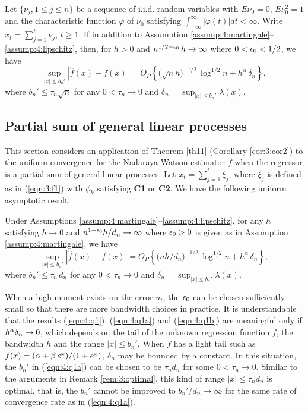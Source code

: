 \begin{cor} 
Let  $\{\nu_{j}, 1 \le j\le n \}$ be a sequence of i.i.d.
random variables with $E\nu_{0}=0$, $E\nu _{0}^{2}=1$ and the
characteristic function $\varphi $ of $\nu_{0}$ satisfying
$\int_{-\infty }^{\infty }|\varphi (t)|dt<\infty $. Write $x_t=\sum_{j=1}^t\nu_j$, $t\ge 1$. If in addition to Assumption \ref{assump:4:martingale}--\ref{assump:4:lipschitz}, then,  for  $h> 0$  and $n^{1/2-\epsilon_0}\, h\to \infty$ where $0<\epsilon_0<1/2$, we have
\begin{equation}
\sup_{|x|\le b_n'}|\widehat{f}(x)-f(x)|=
O_{P}\left\{\big(\sqrt{n}h\big)^{-1/2}\,\log^{1/2}n
+h^{\alpha}\, \delta_n\right\},
\label{eqn:4:q1a}\end{equation}
where $b_n'\le \tau_n\sqrt n$ for any $0<\tau_n\to 0$ and $\delta_n=\sup_{|x|\le b_n'}\lambda(x)$.
\end{cor}

\subsection{Partial sum of general linear processes}

This section considers an application of Theorem \ref{th11} (Corollary \ref{cor:3:cor2}) to the uniform convergence for the Nadaraya-Watson estimator $\widehat{f}$ when the regressor is a partial sum of general linear processes. Let $x_t=\sum_{j=1}^t\xi_j$, where $\xi_j$ is defined as in (\ref {eqn:3:f1}) with $\phi_k$ satisfying {\bf C1} or {\bf C2}. We have the following uniform asymptotic result.

\begin{thm}  Under Assumptions \ref{assump:4:martingale}--\ref{assump:4:lipschitz},
for any $h$ satisfying $h\to 0$ and $n^{1-\epsilon_0}h/d_n\to \infty$ where $\epsilon_0>0$ is given as in Assumption \ref{assump:4:martingale}, we have
\begin{equation} 
\sup_{|x|\le b_n'}|\widehat{f}(x)-f(x)|=
O_{P}\left\{\big(nh/d_n\big)^{-1/2}\,\log^{1/2}n
+h^{\alpha}\, \delta_n\right\},
\label{eqn:4:q1b}\end{equation}
where $b_n'\le \tau_n\,d_n $ for any  $0<\tau_n \to 0$ and $\delta_n=\sup_{|x|\le b_n'}\lambda(x)$.
\end{thm}


\begin{rem} When a high moment exists on the error $u_t$,
the $\epsilon_0$ can be chosen sufficiently small so that there are more bandwidth choices  in practice. It is understandable that the results (\ref {eqn:4:q1}), (\ref {eqn:4:q1a}) and (\ref {eqn:4:q1b}) are meaningful only if $h^{\alpha}\delta_n\to 0$, which depends on the tail of the unknown regression function $f$, the bandwidth $h$ and the range $|x|\le b_n'$.
When $f$ has a light tail such as $f(x)=(\alpha+\beta\, e^{x})/(1+e^x)$, $\delta_n$ may be bounded by a constant. In this situation, the $b_n'$ in (\ref {eqn:4:q1a}) can be chosen to be $\tau_n d_n$ for some $0<\tau_n\to 0$. Similar to the arguments in Remark \ref{rem:3:optimal}, this kind of range $|x|\le \tau_n d_n$ is optimal, that is, the $b_n'$ cannot be improved  to $b_n' / d_n \to \infty$ for the same rate of convergence rate as in (\ref {eqn:4:q1a}).
\end{rem}

